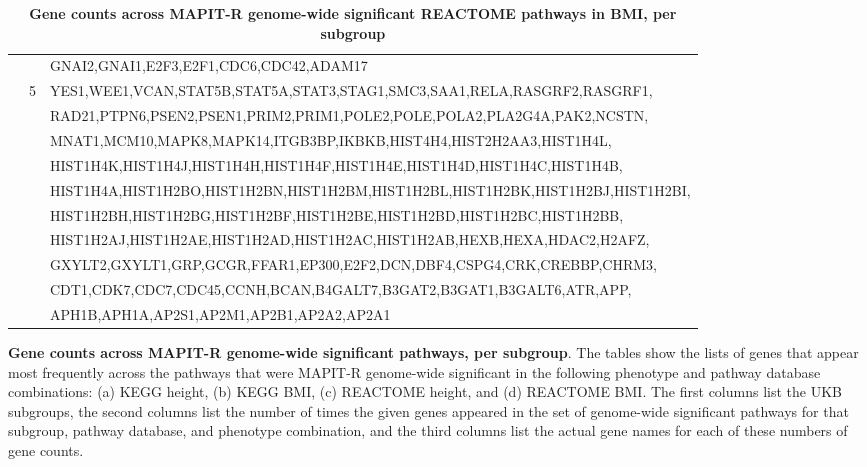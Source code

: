 \documentclass[12pt,a4paper]{article}
\begin{document}
\begin{landscape}
\begin{table}[ht]
\begin{tabular}{ccl}
    & & GNAI2,GNAI1,E2F3,E2F1,CDC6,CDC42,ADAM17 \\  
    & 5 & YES1,WEE1,VCAN,STAT5B,STAT5A,STAT3,STAG1,SMC3,SAA1,RELA,RASGRF2,RASGRF1, \\
    & & RAD21,PTPN6,PSEN2,PSEN1,PRIM2,PRIM1,POLE2,POLE,POLA2,PLA2G4A,PAK2,NCSTN, \\
    & & MNAT1,MCM10,MAPK8,MAPK14,ITGB3BP,IKBKB,HIST4H4,HIST2H2AA3,HIST1H4L, \\
    & & HIST1H4K,HIST1H4J,HIST1H4H,HIST1H4F,HIST1H4E,HIST1H4D,HIST1H4C,HIST1H4B, \\
    & & HIST1H4A,HIST1H2BO,HIST1H2BN,HIST1H2BM,HIST1H2BL,HIST1H2BK,HIST1H2BJ,HIST1H2BI, \\
    & & HIST1H2BH,HIST1H2BG,HIST1H2BF,HIST1H2BE,HIST1H2BD,HIST1H2BC,HIST1H2BB, \\
    & & HIST1H2AJ,HIST1H2AE,HIST1H2AD,HIST1H2AC,HIST1H2AB,HEXB,HEXA,HDAC2,H2AFZ, \\
    & & GXYLT2,GXYLT1,GRP,GCGR,FFAR1,EP300,E2F2,DCN,DBF4,CSPG4,CRK,CREBBP,CHRM3, \\
    & & CDT1,CDK7,CDC7,CDC45,CCNH,BCAN,B4GALT7,B3GAT2,B3GAT1,B3GALT6,ATR,APP, \\ 
    & & APH1B,APH1A,AP2S1,AP2M1,AP2B1,AP2A2,AP2A1 \\
   \hline
\end{tabular}
\caption[TBD]{\textbf{Gene counts across MAPIT-R genome-wide significant REACTOME pathways in BMI, per subgroup}}
\label{InterPath-Supp-Tables-AllPops-TopGeneCounts-REACTOME-BMI-a}
\end{table}
\clearpage
\addtocounter{table}{-1}
\addtocounter{CharNumber2}{1}
\end{landscape}
\renewcommand{\thetable}{\arabic{table}}
\setlength{\footskip}{1cm}

\begin{table} [t!]
  \caption{\textbf{Gene counts across MAPIT-R genome-wide significant pathways, per subgroup}. The tables show the lists of genes that appear most frequently across the pathways that were MAPIT-R genome-wide significant in the following phenotype and pathway database combinations: (a) KEGG height, (b) KEGG BMI, (c) REACTOME height, and (d) REACTOME BMI. The first columns list the UKB subgroups, the second columns list the number of times the given genes appeared in the set of genome-wide significant pathways for that subgroup, pathway database, and phenotype combination, and the third columns list the actual gene names for each of these numbers of gene counts.}
\label{InterPath-Supp-Tables-AllPops-TopGeneCounts-Caption}
\end{table}
\clearpage
\end{document}

